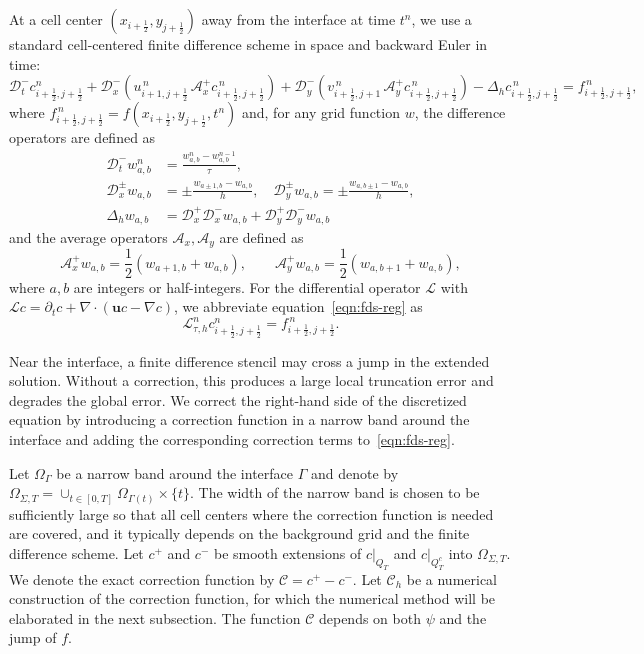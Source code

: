 \documentclass[11pt,reqno]{amsart}
\theoremstyle{plain}
\theoremstyle{definition}
\numberwithin{equation}{section}
\newcommand{\paren}[1]{\left(#1\right)}
\newcommand{\p}{\partial}
\newcommand{\at}[2]{\left. #1 \right|_{#2}}
\newcommand{\grad}[1]{\nabla #1}
\newcommand{\mc}[1]{\mathcal{#1}}
\newcommand{\bm}[1]{\boldsymbol{#1}}
\newcommand{\Corr}{\mathcal C}
\begin{document}
At a cell center $(x_{i+\frac12},y_{j+\frac12})$ away from the interface at time $t^n$, we use a standard cell-centered finite difference scheme in space and backward Euler in time:
\begin{equation}\label{eqn:fds-reg}
\mc D_t^- c_{i+\frac12,j+\frac12}^{n}
+ \mc D_x^- \left(
u_{i+1,j+\frac12}^{\,n}
\, \mc A_x^+ c_{i+\frac12,j+\frac12}^{\,n}
\right)
+ \mc D_y^- \left(
v_{i+\frac12,j+1}^{\,n}
\, \mc A_y^+ c_{i+\frac12,j+\frac12}^{\,n}
\right)
-
\Delta_h c_{i+\frac12,j+\frac12}^{\,n} = f_{i+\frac12,j+\frac12}^{\,n},
\end{equation}
where $f_{i+\frac12,j+\frac12}^{\,n}=f(x_{i+\frac12},y_{j+\frac12},t^n)$ and, for any grid function $w$, the difference operators are defined as
\begin{align}
    \mc D_t^- w_{a,b}^{n} &= \frac{w_{a,b}^{n} - w_{a,b}^{n-1}}{\tau},\\
    \mc D_x^\pm w_{a,b} &= \pm\frac{w_{a\pm 1,b} - w_{a,b}}{h}, \quad \mc D_y^\pm w_{a,b} = \pm\frac{w_{a,b\pm 1} - w_{a,b}}{h},\\
    \Delta_h w_{a,b} &= \mc D_x^+\mc D_x^- w_{a,b} +\mc D_y^+ \mc D_y^- w_{a,b}
\end{align}
and the average operators $\mc A_x,\mc A_y$ are defined as
\begin{equation}
\mc A_x^+ w_{a, b}
= \frac12\left( w_{a+1,b} + w_{a, b} \right),
\qquad
\mc A_y^+ w_{a, b}
= \frac12\left( w_{a, b+1} + w_{a, b} \right),
\end{equation}
where $a, b$ are integers or half-integers.
For the differential operator $\mc L$ with $\mc Lc = \p_t c + \grad\cdot\paren{\bm u c - \grad c}$, we abbreviate equation~\eqref{eqn:fds-reg} as
\begin{equation}
    \mc L_{\tau, h}^n c_{i+\frac12,j+\frac12}^{n} = f_{i+\frac12,j+\frac12}^{\,n}.
\end{equation}

Near the interface, a finite difference stencil may cross a jump in the extended solution. Without a correction, this produces a large local truncation error and degrades the global error. We correct the right-hand side of the discretized equation by introducing a correction function in a narrow band around the interface and adding the corresponding correction terms to~\eqref{eqn:fds-reg}.

Let $\Omega_\Gamma$ be a narrow band around the interface $\Gamma$ and denote by $\Omega_{\Sigma,T} = \cup_{t\in[0,T]}\Omega_{\Gamma(t)}\times\{t\}$.
The width of the narrow band is chosen to be sufficiently large so that all cell centers where the correction function is needed are covered, and it typically depends on the background grid and the finite difference scheme.
Let $c^+$ and $c^-$ be smooth extensions of $\at{c}{Q_T}$ and $\at{c}{Q_T^c}$ into $\Omega_{\Sigma,T}$.
We denote the exact correction function by $\Corr = c^+-c^-$. Let $\Corr_h$ be a numerical construction of the correction function, for which the numerical method will be elaborated in the next subsection. The function $\Corr$ depends on both $\psi$ and the jump of $f$.
\end{document}
